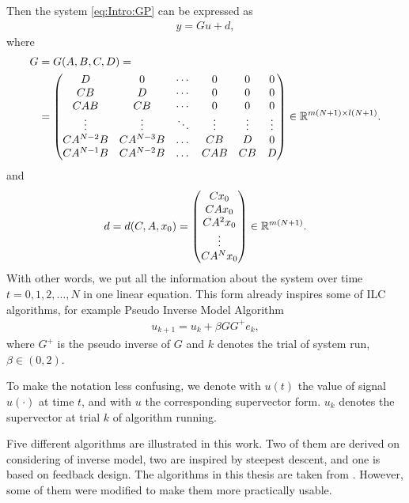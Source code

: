 Then the system \eqref{eq:Intro:GP} can be expressed as 
\begin{align}
\label{eq:Intro:y = Gu + d}
y = G u + d, 
\end{align}
where 
\begin{align}
\label{eq:Intro:Gmatrix}
\begin{split}
G &= G(A,B,C,D) = \\
&=  \begin{pmatrix}
D & 0 & \cdots & 0 & 0 & 0 \\
CB & D & \cdots & 0 & 0 & 0\\
CAB & CB & \cdots & 0 & 0 & 0\\
\vdots & \vdots & \ddots & \vdots  & \vdots & \vdots \\
CA^{N-2} B & CA^{N-3} B &\dots &CB & D& 0\\
CA^{N-1} B & CA^{N-2} B &\dots &CAB & CB& D\\
\end{pmatrix} \in {\mathbb{R}}^{m(N+1)\times l(N+1)}.
\end{split}
\end{align}
and 
\begin{align}
d = d(C,A,x_0) = \begin{pmatrix}
C x_0 \\ CA x_0 \\ CA^2 x_0 \\ \vdots \\ CA^Nx_0
\end{pmatrix} \in {\mathbb{R}}^{m(N+1)}.
\end{align}
With other words, we put all the information about the system over time $t = 0, 1, 2, \dots, N$ in one linear equation. This form already inspires some of ILC algorithms, for example Pseudo Inverse Model Algorithm 
\begin{align}
u_{k+1} = u_k + \beta G G^+ e_k, 
\end{align}
where $G^+$ is the pseudo inverse of $G$ and $k$ denotes the trial of system run, $\beta \in (0,2)$.

To make the notation less confusing, we denote with $u(t)$ the value of signal $u(\cdot)$ at time $t$, and with $u$ the corresponding supervector form. $u_k$ denotes the supervector at trial $k$ of algorithm running.

Five different algorithms are illustrated in this work. Two of them are derived on considering of inverse model, two are inspired by steepest descent, and one is based on feedback design. The algorithms in this thesis are taken from \cite{ILC}. However, some of them were modified to make them more practically usable. 

